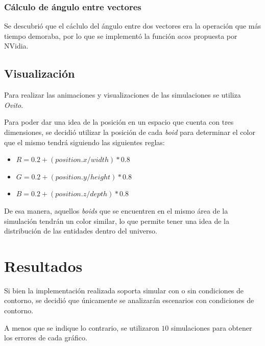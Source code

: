 \documentclass[a4paper]{article}
\begin{document}
            \subsubsection{Cálculo de ángulo entre vectores}
                Se descubrió que el cáclulo del ángulo entre dos vectores era la operación que más tiempo demoraba, por lo que se implementó la función $acos$ propuesta por NVidia\cite{FastAcos}.

        \subsection{Visualización}
            Para realizar las animaciones y visualizaciones de las simulaciones se utiliza \textit{Ovito}.

            Para poder dar una idea de la posición en un espacio que cuenta con tres dimensiones, se decidió utilizar la posición de cada \textit{boid} para determinar el color que el mismo tendrá siguiendo las siguientes reglas:

            \begin{itemize}
                \item $R = 0.2 + (position.x / width) * 0.8$
                \item $G = 0.2 + (position.y / height) * 0.8$
                \item $B = 0.2 + (position.z / depth) * 0.8$
            \end{itemize}

            De esa manera, aquellos \textit{boids} que se encuentren en el mismo área de la simulación tendrán un color similar, lo que permite tener una idea de la distribución de las entidades dentro del universo.

    \section{Resultados}
        Si bien la implementación realizada soporta simular con o sin condiciones de contorno, se decidió que únicamente se analizarán escenarios con condiciones de contorno.

        A menos que se indique lo contrario, se utilizaron $10$ simulaciones para obtener los errores de cada gráfico.
\end{document}
